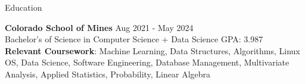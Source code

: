 \documentclass{resume} %
\begin{document}
\vspace{-10pt}

\begin{rSection}{Education}

{\bf Colorado School of Mines} \hfill {Aug 2021 - May 2024}\\
Bachelor's of Science in Computer Science + Data Science \hfill {GPA: 3.987}\\
\textbf{Relevant Coursework}: Machine Learning, Data Structures, Algorithms, Linux OS, Data Science, Software Engineering, Database Management, Multivariate Analysis, Applied Statistics, Probability, Linear Algebra



\end{rSection}
\vspace{-6pt}
\end{document}
